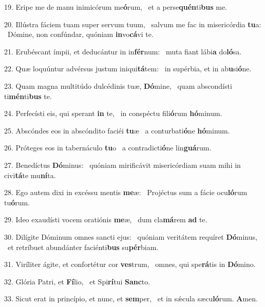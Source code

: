 19. Eripe me de manu inimicórum me\textbf{ó}rum, \ast\  et a perse\textbf{quén}ti\textbf{bus} me.\

20. Illústra fáciem tuam super servum tuum, \dag\  salvum me fac in misericórdia \textbf{tu}a: \ast\  Dómine, non confúndar, quóniam \textbf{in}vo\textbf{cá}vi te.\

21. Erubéscant ímpii, et deducántur in in\textbf{fér}num: \ast\  muta fiant lábi\textbf{a} do\textbf{ló}sa.\

22. Quæ loquúntur advérsus justum iniqui\textbf{tá}tem: \ast\  in supérbia, et in ab\textbf{u}si\textbf{ó}ne.\

23. Quam magna multitúdo dulcédinis tuæ, \textbf{Dó}mine, \ast\  quam abscondísti ti\textbf{mén}ti\textbf{bus} te.\

24. Perfecísti eis, qui sperant \textbf{in} te, \ast\  in conspéctu fili\textbf{ó}rum \textbf{hó}minum.\

25. Abscóndes eos in abscóndito faciéi \textbf{tu}æ \ast\  a conturbati\textbf{ó}ne \textbf{hó}minum.\

26. Próteges eos in tabernáculo \textbf{tu}o \ast\  a contradicti\textbf{ó}ne lin\textbf{guá}rum.\

27. Benedíctus \textbf{Dó}minus: \ast\  quóniam mirificávit misericórdiam suam mihi in civi\textbf{tá}te mu\textbf{ní}ta.\

28. Ego autem dixi in excéssu mentis \textbf{me}æ: \ast\  Projéctus sum a fácie ocu\textbf{ló}rum tu\textbf{ó}rum.\

29. Ideo exaudísti vocem oratiónis \textbf{me}æ, \ast\  dum cla\textbf{má}rem \textbf{ad} te.\

30. Dilígite Dóminum omnes sancti ejus: \dag\  quóniam veritátem requíret \textbf{Dó}minus, \ast\  et retríbuet abundánter faciénti\textbf{bus} su\textbf{pér}biam.\

31. Viríliter ágite, et confortétur cor \textbf{ves}trum, \ast\  omnes, qui spe\textbf{rá}tis in \textbf{Dó}mino.\

32. Glória Patri, et \textbf{Fí}lio, \ast\  et Spi\textbf{rí}tui \textbf{Sanc}to.\

33. Sicut erat in princípio, et nunc, et \textbf{sem}per, \ast\  et in sǽcula sæcu\textbf{ló}rum. \textbf{A}men.\

